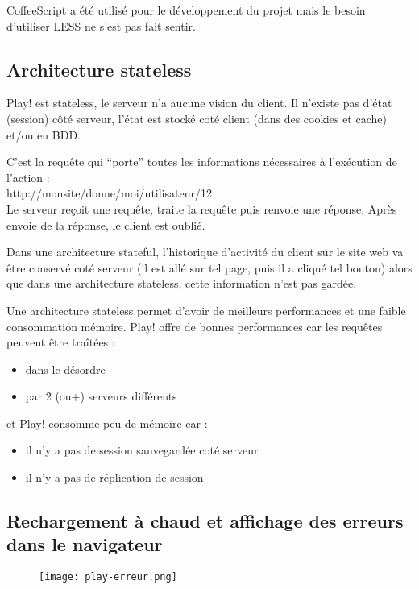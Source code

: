 \bigskip

CoffeeScript a été utilisé pour le développement du projet mais le besoin
d'utiliser LESS ne s'est pas fait sentir.

\subsection{Architecture stateless}

Play! est stateless, le serveur n'a aucune vision du client.
Il n'existe pas d'état (session) côté serveur, l'état est stocké coté client (dans
des cookies et cache) et/ou en BDD.
\bigskip

C'est la requête qui ``porte'' toutes les informations nécessaires à l'exécution
de l'action :\\
http://monsite/donne/moi/utilisateur/12 \\
Le serveur reçoit une requête, traite la requête puis renvoie une réponse.
Après envoie de la réponse, le client est oublié.

Dans une architecture stateful, l'historique d'activité du client sur le site
web va être conservé coté serveur (il est allé sur tel page, puis il a cliqué tel
bouton) alors que dans une architecture stateless, cette information n'est pas
gardée.

Une architecture stateless permet d'avoir de meilleurs performances et une
faible consommation mémoire. Play! offre de bonnes performances car les requêtes
peuvent être traîtées : 
\begin{itemize}
\item dans le désordre
\item par 2 (ou+) serveurs différents
\end{itemize}
et Play! consomme peu de mémoire car :
\begin{itemize}
\item il n'y a pas de session sauvegardée coté serveur
\item il n'y a pas de réplication de session
\end{itemize}

\subsection{Rechargement à chaud et affichage des erreurs dans le navigateur}

\begin{figure}[H]
  \texttt{[image: play-erreur.png]}  
\end{figure}

